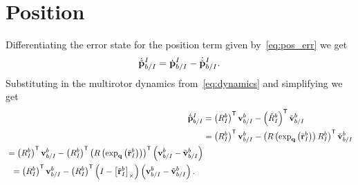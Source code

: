 \section{Position}

Differentiating the error state for the position term given
by~\eqref{eq:pos_err} we get
\begin{equation}
  \dot{\tilde{\mathrm{\mathbf{p}}}}_{b/I}^{I} = \dot{\mathrm{\mathbf{p}}}_{b/I}^{I} -
    \dot{\check{\mathrm{\mathbf{p}}}}_{b/I}^{I}.
\end{equation}
Substituting in the multirotor dynamics from~\eqref{eq:dynamics} and simplifying
we get
\begin{align}
  \dot{\tilde{\mathrm{\mathbf{p}}}}_{b/I}^{I} &= \left(R_{I}^{b}\right)^{\mathsf{T}}
  \mathrm{\mathbf{v}}_{b/I}^{b} - \left(\check{R}_{I}^{b}\right)^{\mathsf{T}}
  \check{\mathrm{\mathbf{v}}}_{b/I}^{b} \\ 
  &= \left(R_{I}^{b}\right)^{\mathsf{T}}
  \mathrm{\mathbf{v}}_{b/I}^{b} -
  \left(R\left(\exp_{\mathrm{\mathbf{q}}}\left(\tilde{\mathrm{\mathbf{r}}}_{I}^{b}\right)\right) R_{I}^{b}\right)^{\mathsf{T}}
  \check{\mathrm{\mathbf{v}}}_{b/I}^{b} \\
  \begin{split}
  &= \left(R_{I}^{b}\right)^{\mathsf{T}}
  \mathrm{\mathbf{v}}_{b/I}^{b}
  - \left(R_{I}^{b}\right)^{\mathsf{T}}
  \left(R\left(\exp_{\mathrm{\mathbf{q}}}\left(\tilde{\mathrm{\mathbf{r}}}_{I}^{b}\right)\right) \right)^{\mathsf{T}}
  \left(\mathrm{\mathbf{v}}_{b/I}^{b} - \tilde{\mathrm{\mathbf{v}}}_{b/I}^b\right) \\
  \end{split} \\
  \begin{split}
  &= \left(R_{I}^{b}\right)^{\mathsf{T}}
  \mathrm{\mathbf{v}}_{b/I}^{b}
  - \left(R_{I}^{b}\right)^{\mathsf{T}}
  \left( I - \left[ \tilde{\mathrm{\mathbf{r}}}_I^b \right]_{\times}\right)
  \left(\mathrm{\mathbf{v}}_{b/I}^{b} - \tilde{\mathrm{\mathbf{v}}}_{b/I}^{b}\right).
  \end{split}
\end{align}
